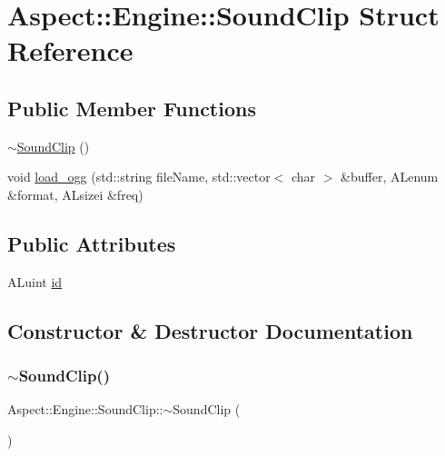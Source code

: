 \hypertarget{struct_aspect_1_1_engine_1_1_sound_clip}{}\section{Aspect\+:\+:Engine\+:\+:Sound\+Clip Struct Reference}
\label{struct_aspect_1_1_engine_1_1_sound_clip}
\subsection*{Public Member Functions}
\begin{DoxyCompactItemize}
\item 
\mbox{\hyperlink{struct_aspect_1_1_engine_1_1_sound_clip_ab30bd8d849c59adb6356c5a6222b0d25}{$\sim$\+Sound\+Clip}} ()
\item 
void \mbox{\hyperlink{struct_aspect_1_1_engine_1_1_sound_clip_afe23f1aea045236c4ced62ff144e3fbe}{load\+\_\+ogg}} (std\+::string file\+Name, std\+::vector$<$ char $>$ \&buffer, A\+Lenum \&format, A\+Lsizei \&freq)
\end{DoxyCompactItemize}
\subsection*{Public Attributes}
\begin{DoxyCompactItemize}
\item 
A\+Luint \mbox{\hyperlink{struct_aspect_1_1_engine_1_1_sound_clip_a4f13ca26dcad6392765f5c170cf1031d}{id}}
\end{DoxyCompactItemize}


\subsection{Constructor \& Destructor Documentation}
\mbox{\label{struct_aspect_1_1_engine_1_1_sound_clip_ab30bd8d849c59adb6356c5a6222b0d25}} 
\subsubsection{\texorpdfstring{$\sim$\+Sound\+Clip()}{~SoundClip()}}
{\footnotesize\ttfamily Aspect\+::\+Engine\+::\+Sound\+Clip\+::$\sim$\+Sound\+Clip (\begin{DoxyParamCaption}{ }\end{DoxyParamCaption})\hspace{0.3cm}{\ttfamily [inline]}}




